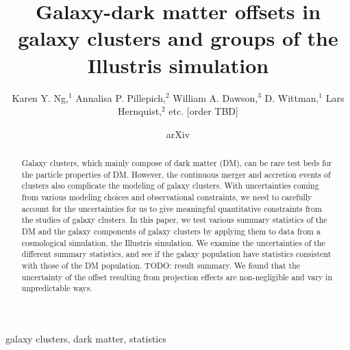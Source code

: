 \documentclass[usenatbib]{mn2e}
\title[Nonmenclature clarified: the centers of clusters and groups of galaxies
	in the Illustris simulation]
{Galaxy-dark matter offsets in galaxy clusters and groups of the
Illustris simulation}
\author[Karen Y. Ng et al.]{Karen Y. Ng,$^{1}$
	Annalisa P. Pillepich,$^{2}$ 
	William A. Dawson,$^{3}$ 
	D. Wittman,$^{1}$
	\newauthor Lars Hernquist,$^{2}$
	etc. [order TBD]
}
\begin{document}
\date{arXiv} \pagerange{\pageref{firstpage}--\pageref{lastpage}}
 \maketitle\label{firstpage}
\begin{abstract} 
	Galaxy clusters, which mainly compose of dark matter (DM), 
	can be rare test beds for the particle properties of DM.
	However, the continuous merger and accretion events of clusters also
	complicate the modeling of galaxy clusters.
	With uncertainties coming from various modeling choices and observational 
	constraints, we need to carefully account for the
	uncertainties for us to give meaningful quantitative constraints from 
	the studies of galaxy clusters. In this paper, 
	we test various summary statistics of the DM and the galaxy components
	of galaxy clusters by applying them to data from a cosmological simulation,
	the Illustris simulation. 
	We examine the uncertainties of the different summary statistics, and see
	if the galaxy population have statistics consistent with those of the DM
	population. TODO: result summary.
	We found that the uncertainty of the offset resulting from projection effects 
	are non-negligible and vary in unpredictable ways. 
\end{abstract}

\begin{keywords}
	galaxy clusters, dark matter, statistics 
\end{keywords}





% 
\appendix


\clearpage\bsp\label{lastpage} 
\end{document}
